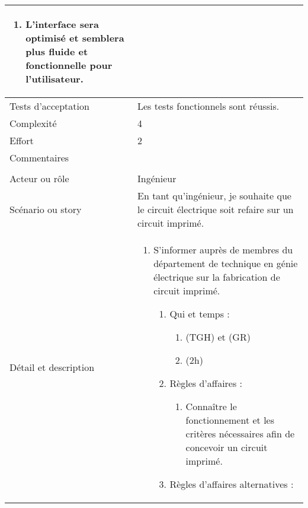 \begin{longtable}{|l|p{}|}
\begin{enumerate}[label*=\arabic*.]
\begin{enumerate}[label*=\arabic*.]
\begin{enumerate}[label*=\arabic*.]
                                    \item L'interface sera optimisé et semblera plus fluide et fonctionnelle pour l'utilisateur.
                                \end{enumerate}
                            \end{enumerate}
        \end{enumerate} \\
\hline
    Tests d'acceptation & Les tests fonctionnels sont réussis. \\
\hline
    Complexité & 4 \\
\hline
    Effort & 2 \\
\hline
    Commentaires & \\

\hline
    \rowcolor{Gray}
    \multicolumn{2}{|l|}{4} \\
\hline
    Acteur ou rôle & Ingénieur \\
\hline
    Scénario ou story & En tant qu'ingénieur, je souhaite que le circuit électrique soit refaire sur un circuit imprimé. \\
\hline
    Détail et description &
        \begin{enumerate}[label*=\arabic*.]
            \item S'informer auprès de membres du département de technique en génie électrique sur la fabrication de circuit imprimé.
                \begin{enumerate}[label*=\arabic*.]
                                \item Qui et temps :
                                \begin{enumerate}[label*=\arabic*.]
                                    \item (TGH) et (GR)
                                    \item (2h)
                                \end{enumerate}
                                \item Règles d'affaires :
                                \begin{enumerate}[label*=\arabic*.]
                                    \item Connaître le fonctionnement et les critères nécessaires afin de concevoir un circuit imprimé.
                                \end{enumerate}
                                \item Règles d'affaires alternatives :
                                \begin{enumerate}[label*=\arabic*.]

\end{enumerate}
\end{enumerate}
\end{enumerate}
\end{longtable}
